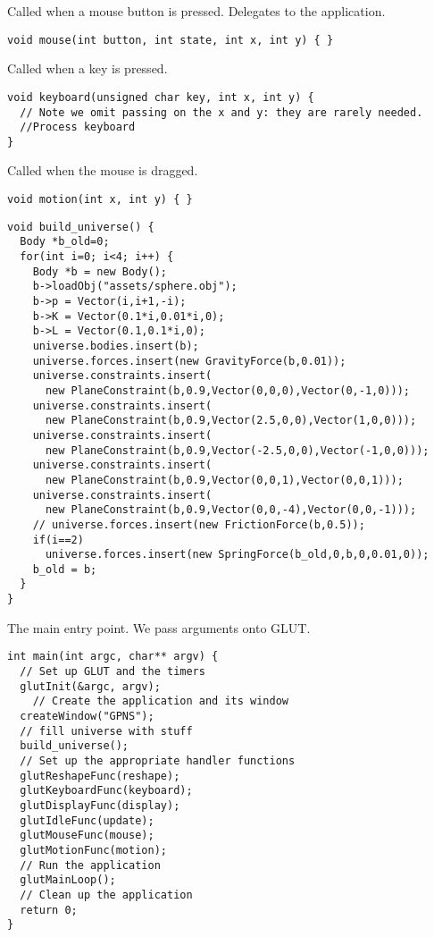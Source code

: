 Called when a mouse button is pressed. Delegates to the
application.
\begin{lstlisting}
void mouse(int button, int state, int x, int y) { }
\end{lstlisting}

Called when a key is pressed.
\begin{lstlisting}
void keyboard(unsigned char key, int x, int y) {
  // Note we omit passing on the x and y: they are rarely needed.
  //Process keyboard
}
\end{lstlisting}

Called when the mouse is dragged.
\begin{lstlisting}
void motion(int x, int y) { }
\end{lstlisting}


\begin{lstlisting}
void build_universe() {
  Body *b_old=0;
  for(int i=0; i<4; i++) {
    Body *b = new Body();
    b->loadObj("assets/sphere.obj");
    b->p = Vector(i,i+1,-i);
    b->K = Vector(0.1*i,0.01*i,0);
    b->L = Vector(0.1,0.1*i,0);
    universe.bodies.insert(b);
    universe.forces.insert(new GravityForce(b,0.01));
    universe.constraints.insert(
      new PlaneConstraint(b,0.9,Vector(0,0,0),Vector(0,-1,0)));
    universe.constraints.insert(
      new PlaneConstraint(b,0.9,Vector(2.5,0,0),Vector(1,0,0)));
    universe.constraints.insert(
      new PlaneConstraint(b,0.9,Vector(-2.5,0,0),Vector(-1,0,0)));
    universe.constraints.insert(
      new PlaneConstraint(b,0.9,Vector(0,0,1),Vector(0,0,1)));
    universe.constraints.insert(
      new PlaneConstraint(b,0.9,Vector(0,0,-4),Vector(0,0,-1)));
    // universe.forces.insert(new FrictionForce(b,0.5));
    if(i==2)
      universe.forces.insert(new SpringForce(b_old,0,b,0,0.01,0));
    b_old = b;
  }
}
\end{lstlisting}

The main entry point. We pass arguments onto GLUT.
\begin{lstlisting}
int main(int argc, char** argv) {
  // Set up GLUT and the timers
  glutInit(&argc, argv);
    // Create the application and its window
  createWindow("GPNS");
  // fill universe with stuff
  build_universe();
  // Set up the appropriate handler functions
  glutReshapeFunc(reshape);
  glutKeyboardFunc(keyboard);
  glutDisplayFunc(display);
  glutIdleFunc(update);
  glutMouseFunc(mouse);
  glutMotionFunc(motion);  
  // Run the application
  glutMainLoop();  
  // Clean up the application
  return 0;
}
\end{lstlisting}
